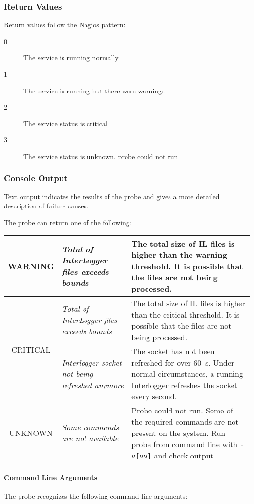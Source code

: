 \subsubsection{Return Values} 
Return values follow the Nagios pattern:

\begin{description} 
\item[0] The service is running normally
\item[1] The service is running but there were warnings
\item[2] The service status is critical
\item[3] The service status is unknown, probe could not run
\end{description}

\subsubsection{Console Output}
Text output indicates the results of the probe and gives a more detailed description of failure causes.

The probe can return one of the following:

\begin{tabularx}{\textwidth}{|c|p{5cm}|X|} 
\hline
WARNING & \emph{Total of InterLogger files exceeds bounds} & The total size of IL files is higher than the warning threshold. It is possible that the files are not being processed.\\\hline
\multirow{2}{*}{CRITICAL} & \emph{Total of InterLogger files exceeds bounds} & The total size of IL files is higher than the critical threshold. It is possible that the files are not being processed.\ \\
& \emph{Interlogger socket not being refreshed anymore} & The socket has not been refreshed for over 60~s. Under normal circumstances, a running Interlogger refreshes the socket every second.\\\hline
UNKNOWN & \emph{Some commands are not available} & Probe could not run. Some of the required commands are not present on the system. Run probe from command line with \texttt{-v[vv]} and check output. \\\hline
\end{tabularx}

\paragraph{Command Line Arguments}
The probe recognizes the following command line arguments:

